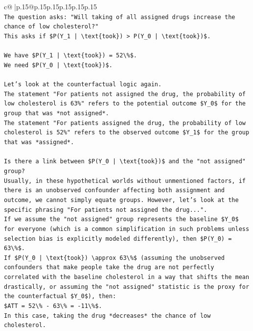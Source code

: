 \documentclass{article}
\begin{document}
{\begin{supertabular}{c@{$\;$}|p{.15\linewidth}@{}p{.15\linewidth}p{.15\linewidth}p{.15\linewidth}p{.15\linewidth}p{.15\linewidth}}
{{{\\ 
\texttt{The question asks: "Will taking of all assigned drugs increase the chance of low cholesterol?"} \\
\texttt{This asks if \$P(Y\_1 | \textbackslash{}text\{took\}) > P(Y\_0 | \textbackslash{}text\{took\})\$.} \\
\\ 
\texttt{We have \$P(Y\_1 | \textbackslash{}text\{took\}) = 52\textbackslash{}\%\$.} \\
\texttt{We need \$P(Y\_0 | \textbackslash{}text\{took\})\$.} \\
\\ 
\texttt{Let's look at the counterfactual logic again.} \\
\texttt{The statement "For patients not assigned the drug, the probability of low cholesterol is 63\%" refers to the potential outcome \$Y\_0\$ for the group that was *not assigned*.} \\
\texttt{The statement "For patients assigned the drug, the probability of low cholesterol is 52\%" refers to the observed outcome \$Y\_1\$ for the group that was *assigned*.} \\
\\ 
\texttt{Is there a link between \$P(Y\_0 | \textbackslash{}text\{took\})\$ and the "not assigned" group?} \\
\texttt{Usually, in these hypothetical worlds without unmentioned factors, if there is an unobserved confounder affecting both assignment and outcome, we cannot simply equate groups. However, let's look at the specific phrasing "For patients not assigned the drug...".} \\
\texttt{If we assume the "not assigned" group represents the baseline \$Y\_0\$ for everyone (which is a common simplification in such problems unless selection bias is explicitly modeled differently), then \$P(Y\_0) = 63\textbackslash{}\%\$.} \\
\texttt{If \$P(Y\_0 | \textbackslash{}text\{took\}) \textbackslash{}approx 63\textbackslash{}\%\$ (assuming the unobserved confounders that make people take the drug are not perfectly correlated with the baseline cholesterol in a way that shifts the mean drastically, or assuming the "not assigned" statistic is the proxy for the counterfactual \$Y\_0\$), then:} \\
\texttt{\$ATT = 52\textbackslash{}\% {-} 63\textbackslash{}\% = {-}11\textbackslash{}\%\$.} \\
\texttt{In this case, taking the drug *decreases* the chance of low cholesterol.} \\
}}}
\end{supertabular}}
\end{document}
